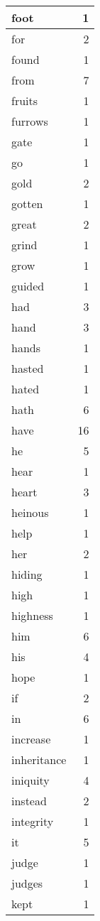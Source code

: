 \begin{center}
\begin{longtable}{l|r}
foot & 1 \\ \hline
for & 2 \\ \hline
found & 1 \\ \hline
from & 7 \\ \hline
fruits & 1 \\ \hline
furrows & 1 \\ \hline
gate & 1 \\ \hline
go & 1 \\ \hline
gold & 2 \\ \hline
gotten & 1 \\ \hline
great & 2 \\ \hline
grind & 1 \\ \hline
grow & 1 \\ \hline
guided & 1 \\ \hline
had & 3 \\ \hline
hand & 3 \\ \hline
hands & 1 \\ \hline
hasted & 1 \\ \hline
hated & 1 \\ \hline
hath & 6 \\ \hline
have & 16 \\ \hline
he & 5 \\ \hline
hear & 1 \\ \hline
heart & 3 \\ \hline
heinous & 1 \\ \hline
help & 1 \\ \hline
her & 2 \\ \hline
hiding & 1 \\ \hline
high & 1 \\ \hline
highness & 1 \\ \hline
him & 6 \\ \hline
his & 4 \\ \hline
hope & 1 \\ \hline
if & 2 \\ \hline
in & 6 \\ \hline
increase & 1 \\ \hline
inheritance & 1 \\ \hline
iniquity & 4 \\ \hline
instead & 2 \\ \hline
integrity & 1 \\ \hline
it & 5 \\ \hline
judge & 1 \\ \hline
judges & 1 \\ \hline
kept & 1 \\ \hline

\end{longtable}
\end{center}
